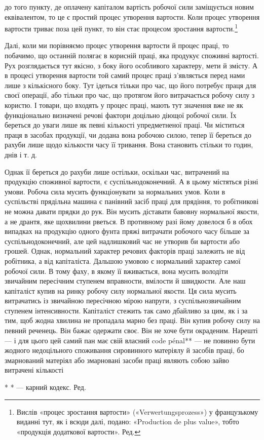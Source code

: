 \parcont{}  %
до того пункту, де оплачену капіталом вартість робочої сили заміщується
новим еквівалентом, то це є простий процес утворення
вартости. Коли процес утворення вартости триває поза цей пункт,
то він стає процесом зростання вартости.\footnote*{
Вислів «процес зростання вартости» («Verwertungsprozess») у французькому
виданні тут, як і всюди далі, подано: «Production de plus
value», тобто «продукція додаткової вартости». Ред.
}

Далі, коли ми порівняємо процес утворення вартости й процес
праці, то побачимо, що останній полягає в корисній праці, яка
продукує споживні вартості. Рух розглядається тут якісно,
з боку його особливого характеру, мети й змісту. А в процесі
утворення вартости той самий процес праці з’являється перед
нами лише з кількісного боку. Тут ідеться тільки про час, що
його потребує праця для своєї операції, або тільки про час, що
протягом його витрачається робочу силу з користю. І товари,
що входять у процес праці, мають тут значення вже не як функціонально
визначені речові фактори доцільно діющої робочої
сили. Їх береться до уваги лише як певні кількості упредметненої
праці. Чи міститься праця в засобах продукції, чи додана
вона робочою силою, тепер її береться до рахуби лише щодо
кількости часу її тривання. Вона становить стільки то годин,
днів і т. д.

Однак її береться до рахуби лише остільки, оскільки час,
витрачений на продукцію споживної вартости, є суспільнодоконечний.
А в цьому містяться різні умови. Робоча сила мусить
функціонувати за нормальних умов. Коли в суспільстві прядільна
машина є панівний засіб праці для прядіння, то робітникові
не можна давати прядки до рук. Він мусить діставати бавовну
нормальної якости, а не дрантя, яке щохвилини рветься. В противному
разі йому довелося б в обох випадках на продукцію одного
фунта пряжі витрачати робочого часу більше за суспільнодоконечний,
але цей надлишковий час не утворив би вартости
або грошей. Однак, нормальний характер речових факторів праці
залежить не від робітника, а від капіталіста. Дальшою умовою
є нормальний характер самої робочої сили. В тому фаху, в якому
її вживається, вона мусить володіти звичайним пересічним ступенем
вправности, вмілости й швидкости. Але наш капіталіст
купив на ринку робочу силу нормальної якости. Ця сила мусить
витрачатись із звичайною пересічною мірою напруги, з суспільнозвичайним
ступенем інтенсивности. Капіталіст стежить так само
дбайливо за цим, як і за тим, щоб жодна хвилина не пропадала
марно без праці. Він купив робочу силу на певний реченець.
Він бажає одержати своє. Він не хоче бути окраденим. Нарешті —
і для цього цей самий пан має свій власний code pénal** — не
повинно бути жодного недоцільного споживання сировинного
матеріялу й засобів праці, бо змарнований матеріял або змарновані
засоби праці являють собою зайво витрачені кількості

* * — карний кодекс. Ред.
\parbreak{}  %
